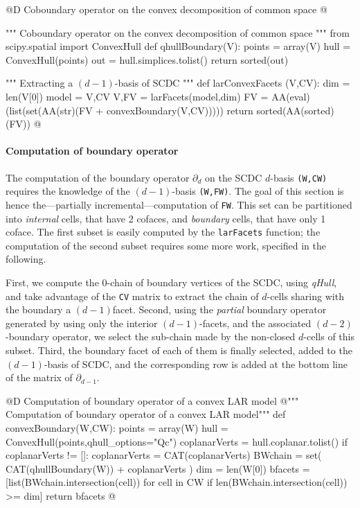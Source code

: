 \documentclass[11pt,oneside]{article}	%
\begin{document}
@D Coboundary operator on the convex decomposition of common space
@{""" Coboundary operator on the convex decomposition of common space """
from scipy.spatial import ConvexHull
def qhullBoundary(V):
	points = array(V)
	hull = ConvexHull(points)
	out = hull.simplices.tolist()
	return sorted(out)

""" Extracting a $(d-1)$-basis of SCDC """
def larConvexFacets (V,CV):
	dim = len(V[0])
	model = V,CV
	V,FV = larFacets(model,dim)
	FV = AA(eval)(list(set(AA(str)(FV + convexBoundary(V,CV)))))
	return sorted(AA(sorted)(FV))
@}


\paragraph{Computation of boundary operator}

The computation of the boundary operator $\partial_d$ on the SCDC $d$-basis \texttt{(W,CW)} requires the knowledge of the $(d-1)$-basis \texttt{(W,FW)}. The goal of this section is hence the---partially incremental---computation of \texttt{FW}. This set can be partitioned into \emph{internal} cells, that have 2 cofaces, and \emph{boundary} cells, that have only 1 coface. The first subset is easily computed by the \texttt{larFacets} function; the computation of the second subset requires some more work, specified in the following.

First, we compute the 0-chain of boundary vertices of the SCDC, using \emph{qHull}, and take advantage of the \texttt{CV} matrix to extract the chain of $d$-cells sharing with the boundary a $(d-1)$facet. Second, using the \emph{partial} boundary operator generated by using only the interior $(d-1)$-facets, and the associated $(d-2)$-boundary operator, we select the sub-chain made by the non-closed $d$-cells of this subset. Third, the boundary facet of each of them is finally selected, added to the $(d-1)$-basis of SCDC, and the corresponding row is added at the bottom line of the matrix of $\partial_{d-1}$.

@D Computation of boundary operator of a convex LAR model
@{""" Computation of boundary operator of a convex LAR model"""
def convexBoundary(W,CW):
	points = array(W)
	hull = ConvexHull(points,qhull_options="Qc")
	coplanarVerts = hull.coplanar.tolist()
	if coplanarVerts != []:  coplanarVerts = CAT(coplanarVerts)
	BWchain = set( CAT(qhullBoundary(W)) + coplanarVerts )
	dim = len(W[0])
	bfacets = [list(BWchain.intersection(cell)) 
					for cell in CW if len(BWchain.intersection(cell)) >= dim]
	return bfacets
@}
\end{document}
